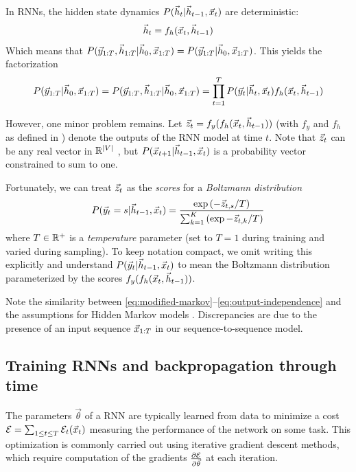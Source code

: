In RNNs, the hidden state dynamics $P(\vec{h}_t | \vec{h}_{t-1}, \vec{x}_t)$ are deterministic:
\begin{equation}
  \vec{h}_t = f_h(\vec{x}_t, \vec{h}_{t-1})
\end{equation}
Which means that $P(\vec{y}_{1:T}, \vec{h}_{1:T} | \vec{h}_0, \vec{x}_{1:T}) = P(\vec{y}_{1:T} | \vec{h}_0, \vec{x}_{1:T})$.
This yields the factorization
\begin{equation}
  P(\vec{y}_{1:T} | \vec{h}_0, \vec{x}_{1:T})
  = P(\vec{y}_{1:T}, \vec{h}_{1:T} | \vec{h}_0, \vec{x}_{1:T})
  = \prod_{t=1}^T P(\vec{y}_t | \vec{h}_t, \vec{x}_t) f_h(\vec{x}_t, \vec{h}_{t-1})
\end{equation}

However, one minor problem remains. Let $\vec{z}_t = f_y(f_h(\vec{x}_t, \vec{h}_{t-1}))$ (with
$f_y$ and $f_h$ as defined in ) denote the outputs of the RNN model
at time $t$. Note that $\vec{z}_t$ can be any real vector in $\mathbb{R}^{|V|}$
, but $P(\vec{x}_{t+1} | \vec{h}_{t-1}, \vec{x}_{t})$ is
a probability vector constrained to sum to one.

Fortunately, we can treat $\vec{z}_t$ as the \emph{scores} for a \emph{Boltzmann
distribution}
\begin{equation}\label{eq:boltzmann-dist}
    P( \vec{y}_{t} = s | \vec{h}_{t-1}, \vec{x}_t )
    = \frac{\exp \left(-\vec{z}_{t,s}/T\right) }{ \sum_{k=1}^{K} \left(\exp -\vec{z}_{t,k}/T\right)}
\end{equation}
where $T \in \mathbb{R}^+$ is a \emph{temperature} parameter (set to $T=1$ during training and varied during sampling).
To keep notation compact, we omit writing this explicitly and understand $P(\vec{y}_t | \vec{h}_{t-1}, \vec{x}_t)$ to mean
the Boltzmann distribution parameterized by the scores $f_y(f_h(\vec{x}_t, \vec{h}_{t-1}))$.

Note the similarity between \cref{eq:modified-markov}--\cref{eq:output-independence}
and the assumptions for Hidden Markov models \citep{ramage2007hidden}. Discrepancies are due
to the presence of an input sequence $\vec{x}_{1:T}$ in our sequence-to-sequence model.



\subsection{Training RNNs and backpropagation through time}


The parameters $\vec{\theta}$ of a RNN are typically learned from data to
minimize a cost $\mathcal{E} = \sum_{1 \leq t \leq T} \mathcal{E}_t(\vec{x}_t)$
measuring the performance of the network on some task. This optimization is
commonly carried out using iterative gradient descent methods, which require
computation of the gradients $\frac{\partial \mathcal{E}}{\partial \vec{\theta}}$ at each
iteration.

